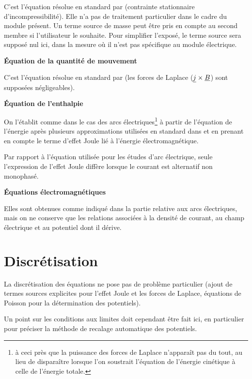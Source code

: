 C'est l'équation résolue en standard par \CS (contrainte
stationnaire d'incompressibilité). Elle n'a pas de traitement particulier dans
le cadre du module présent. Un terme source de  masse peut être pris en
compte au second membre si l'utilisateur le souhaite. Pour simplifier
l'exposé,
le terme source sera supposé nul ici, dans la mesure où il n'est pas
spécifique au module électrique.

\vspace*{0,5cm}
{\bf Équation de la quantité de mouvement}
\nopagebreak

C'est l'équation résolue en standard par \CS (les forces de Laplace
($\underline{j} \times \underline{B}$) sont supposées négligeables).

\vspace*{0,5cm}
{\bf Équation de l'enthalpie}
\nopagebreak

On l'établit comme dans le cas des arcs électriques\footnote{à ceci près
que la puissance des
forces de Laplace n'apparaît pas du tout, au lieu de disparaître lorsque
l'on soustrait l'équation de l'énergie cinétique à celle de l'énergie
totale.} à partir de l'équation de
l'énergie après plusieurs approximations utilisées en standard dans \CS et en
prenant en compte le terme d'effet Joule lié à l'énergie
électromagnétique.

Par rapport à l'équation utilisée pour les études d'arc électrique,
seule l'expression de l'effet Joule diffère lorsque le courant est
alternatif non monophasé.

\vspace*{0,5cm}
{\bf Équations électromagnétiques}
\nopagebreak

Elles sont obtenues comme indiqué dans la partie relative aux arcs
électriques, mais on ne conserve que les relations associées à la
densité de courant, au champ électrique et au potentiel dont il dérive.

\section*{Discrétisation}

La discrétisation des équations ne pose pas de problème particulier
(ajout de termes sources explicites pour l'effet Joule et les forces de Laplace,
équations de Poisson pour la détermination des potentiels).

Un point sur les conditions aux limites doit cependant être fait ici, en
particulier pour préciser la méthode de recalage automatique des
potentiels.



